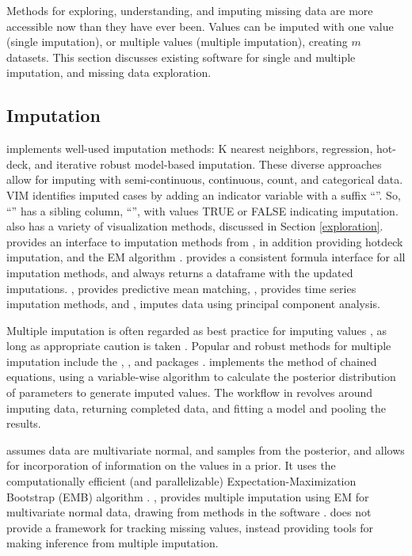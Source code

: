 \documentclass[
]{jss}
\begin{document}
Methods for exploring, understanding, and imputing missing data are more accessible now than they have ever been. Values can be imputed with one value (single imputation), or multiple values (multiple imputation), creating \(m\) datasets. This section discusses existing software for single and multiple imputation, and missing data exploration.

\hypertarget{imputation}{%
\subsection{Imputation}\label{imputation}}

 \citep{VIM} implements well-used imputation methods: K nearest neighbors, regression, hot-deck, and iterative robust model-based imputation. These diverse approaches allow for imputing with semi-continuous, continuous, count, and categorical data. VIM identifies imputed cases by adding an indicator variable with a suffix ``''. So, ``'' has a sibling column, ``'', with values TRUE or FALSE indicating imputation.  also has a variety of visualization methods, discussed in Section \ref{exploration}.  provides an interface to imputation methods from , in addition providing hotdeck imputation, and the EM algorithm \citep{simputation, Dempster1977}.  provides a consistent formula interface for all imputation methods, and always returns a dataframe with the updated imputations.  \citep{Hmisc}, provides predictive mean matching,  \citep{imputeTS}, provides time series imputation methods, and  \citep{missMDA}, imputes data using principal component analysis.

Multiple imputation is often regarded as best practice for imputing values \citep{Schafer2002}, as long as appropriate caution is taken \citep{Sterne2009}. Popular and robust methods for multiple imputation include the , , and  packages \citep{mice, amelia, mi}.  implements the method of chained equations, using a variable-wise algorithm to calculate the posterior distribution of parameters to generate imputed values. The workflow in  revolves around imputing data, returning completed data, and fitting a model and pooling the results.

 \citep{amelia} assumes data are multivariate normal, and samples from the posterior, and allows for incorporation of information on the values in a prior. It uses the computationally efficient (and parallelizable) Expectation-Maximization Bootstrap (EMB) algorithm \citep{Honaker2010}.  \citep{norm}, provides multiple imputation using EM for multivariate normal data, drawing from methods in the  software \citep{schafer-norm}.  does not provide a framework for tracking missing values, instead providing tools for making inference from multiple imputation.
\end{document}
